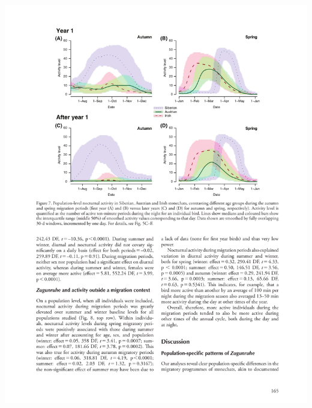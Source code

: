 \documentclass[a4paper, twoside]{templates/ociamthesis}
\begin{document}
\begin{center}\includegraphics[width=1\linewidth]{pdf_chapters/zug/zug_crop_Part11} \end{center}
\end{document}
